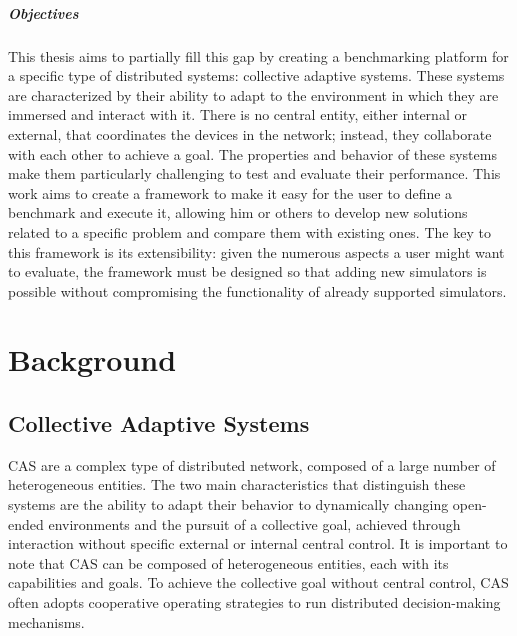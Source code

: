 \documentclass[12pt,a4paper,openright,twoside]{book}
\begin{document}
\paragraph{Objectives}

This thesis aims to partially fill this gap by creating a benchmarking platform \cite{DBLP:conf/cisis/VilenicaL12, DBLP:conf/atal/ZhangZWBR20} for a specific type of distributed systems: collective adaptive systems.
These systems are characterized by their ability to adapt to the environment in which they are immersed and interact with it. \cite{DBLP:conf/birthday/BucchiaroneM19}
There is no central entity, either internal or external, that coordinates the devices in the network; instead, they collaborate with each other to achieve a goal. 
The properties and behavior of these systems make them particularly challenging to test and evaluate their performance. \cite{DBLP:conf/srds/AlmeidaMV10}
This work aims to create a framework to make it easy for the user to define a benchmark and execute it, 
allowing him or others to develop new solutions related to a specific problem and compare them with existing ones. 
The key to this framework is its extensibility: given the numerous aspects a user might want to evaluate, 
the framework must be designed so that adding new simulators is possible without compromising the functionality of already supported simulators. \cite{DBLP:conf/mascots/Dujmovic99}

\chapter{Background}

\section{Collective Adaptive Systems}

\ac{CAS} are a complex type of distributed network, composed of a large number of heterogeneous entities.
The two main characteristics that distinguish these systems are the ability to adapt their behavior to dynamically changing open-ended environments
and the pursuit of a collective goal, achieved through interaction without specific external or internal central control. \cite{DBLP:series/lncs/HolzlRW08, DBLP:journals/corr/abs-1108-5643}
It is important to note that \ac{CAS} can be composed of heterogeneous entities, each with its capabilities and goals.
To achieve the collective goal without central control, \ac{CAS} often adopts cooperative operating strategies to run distributed decision-making mechanisms. \cite{DBLP:journals/tomacs/Aldini18} \\
\end{document}
